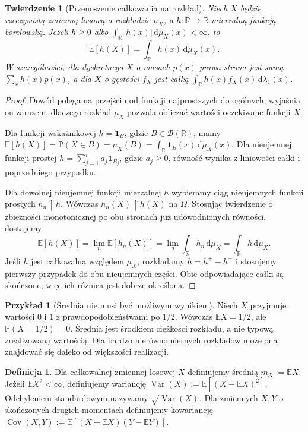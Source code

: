 \documentclass[11pt,a4paper,oneside]{report}
\numberwithin{equation}{chapter}
\theoremstyle{plain}
\newtheorem{twierdzenie}{Twierdzenie}[chapter]
\theoremstyle{definition}
\newtheorem{definicja}{Definicja}[chapter]
\newtheorem{przyklad}{Przykład}[chapter]
\theoremstyle{remark}
\newcommand{\R}{\mathbb{R}}
\newcommand{\Prob}{\mathbb{P}}
\newcommand{\E}{\mathbb{E}}
\newcommand{\Var}{\operatorname{Var}}
\newcommand{\Cov}{\operatorname{Cov}}
\newcommand{\ind}[1]{\mathbf{1}_{#1}}
\newcommand{\dd}{\mathrm{d}}
\begin{document}
\begin{twierdzenie}[Przenoszenie całkowania na rozkład]
Niech $X$ będzie rzeczywistą zmienną losową o rozkładzie $\mu_X$,
a $h:\R\to\R$ mierzalną funkcją borelowską.
Jeżeli $h\geq0$ albo $\int_\R|h(x)|\,\dd\mu_X(x)<\infty$, to
\begin{equation}\label{eq:lotus}
\E[h(X)]=\int_\R h(x)\,\dd\mu_X(x).
\end{equation}
W szczególności, dla dyskretnego $X$ o masach $p(x)$ prawa strona
jest sumą $\sum_xh(x)p(x)$, a dla $X$ o gęstości $f_X$
jest całką $\int_\R h(x)f_X(x)\,\dd\lambda_1(x)$.
\end{twierdzenie}
\begin{proof}
Dowód polega na przejściu od funkcji najprostszych
do ogólnych; wyjaśnia on zarazem, dlaczego rozkład
$\mu_X$ pozwala obliczać wartości oczekiwane funkcji $X$.

Dla funkcji wskaźnikowej $h=\ind B$, gdzie
$B\in\mathcal B(\R)$, mamy
$\E[h(X)]=\Prob(X\in B)=\mu_X(B)
=\int_\R\ind B(x)\,\dd\mu_X(x)$.
Dla nieujemnej funkcji prostej
$h=\sum_{j=1}^r a_j\ind{B_j}$, gdzie $a_j\geq0$,
równość wynika z liniowości całki i poprzedniego przypadku.

Dla dowolnej nieujemnej funkcji mierzalnej $h$
wybieramy ciąg nieujemnych funkcji prostych $h_n\uparrow h$.
Wówczas $h_n(X)\uparrow h(X)$ na $\Omega$.
Stosując twierdzenie o zbieżności monotonicznej
po obu stronach już udowodnionych równości, dostajemy
\[
\E[h(X)]=\lim_n\E[h_n(X)]
=\lim_n\int_\R h_n\,\dd\mu_X
=\int_\R h\,\dd\mu_X.
\]
Jeśli $h$ jest całkowalna względem $\mu_X$,
rozkładamy $h=h^+-h^-$ i stosujemy pierwszy przypadek
do obu nieujemnych części. Obie odpowiadające całki
są skończone, więc ich różnica jest dobrze określona.
\end{proof}


\begin{przyklad}[Średnia nie musi być możliwym wynikiem]
Niech $X$ przyjmuje wartości $0$ i $1$ z prawdopodobieństwami
po $1/2$. Wówczas $\E X=1/2$, ale $\Prob(X=1/2)=0$.
Średnia jest środkiem ciężkości rozkładu, a nie typową
zrealizowaną wartością. Dla bardzo nierównomiernych rozkładów
może ona znajdować się daleko od większości realizacji.
\end{przyklad}

\begin{definicja}
Dla całkowalnej zmiennej losowej $X$ definiujemy średnią
$m_X:=\E X$. Jeżeli $\E X^2<\infty$, definiujemy
wariancję $\Var(X):=\E[(X-\E X)^2]$.
Odchyleniem standardowym nazywamy $\sqrt{\Var(X)}$.
Dla zmiennych $X,Y$ o skończonych drugich momentach definiujemy
kowariancję $\Cov(X,Y):=\E[(X-\E X)(Y-\E Y)]$.
\end{definicja}
\end{document}

